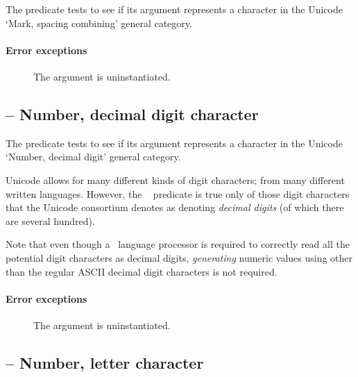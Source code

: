 The  predicate tests to see if its  argument represents a character in the Unicode `Mark, spacing combining' general category. 
        
\paragraph{Error exceptions}
\begin{description}
\item[]
The argument is uninstantiated.
\end{description}

\subsection{ -- Number, decimal digit character}
\label{chars:isNdChar}

The  predicate tests to see if its  argument represents a character in the Unicode `Number, decimal digit' general category. 

Unicode allows for many different kinds of digit characters; from many different written languages. However, the \go\  predicate is true only of those digit characters that the Unicode consortium denotes as denoting {\em decimal digits} (of which there are several hundred).
    
Note that even though a \go\ language processor is required to  correctly read all the potential digit characters as decimal digits, {\em generating} numeric values using other than the regular ASCII decimal digit characters is not required.
        
\paragraph{Error exceptions}
\begin{description}
\item[]
The argument is uninstantiated.
\end{description}

\subsection{ -- Number, letter character}
\label{chars:isNlChar}

